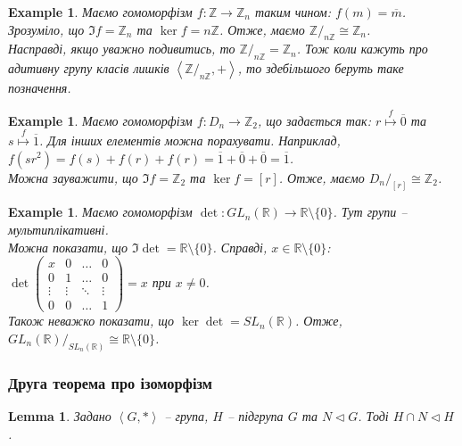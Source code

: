 \documentclass[a4paper, 10pt]{article}
\theoremstyle{theoremdd}
\theoremstyle{theoremdd}
\theoremstyle{theoremdd}
\theoremstyle{theoremdd}
\theoremstyle{theoremdd}
\newtheorem{example}[theorem]{Example}
\theoremstyle{theoremdd}
\theoremstyle{theoremdd}
\theoremstyle{theoremdd}
\theoremstyle{theoremdd}
\theoremstyle{theoremdd}
\theoremstyle{theoremdd}
\theoremstyle{theoremdd}
\theoremstyle{theoremdd}
\newtheorem{lemma}[theorem]{Lemma}
\theoremstyle{theoremdd}
\theoremstyle{theoremdd}
\begin{document}
\begin{example}
Маємо гомоморфізм $f \colon \mathbb{Z} \to \mathbb{Z}_n$ таким чином: $f(m) = \overline{m}$.\\
Зрозуміло, що $\Im f = \mathbb{Z}_n$ та $\ker f = n \mathbb{Z}$. Отже, маємо $\mathbb{Z}/_{n \mathbb{Z}} \cong \mathbb{Z}_n$.\\
Насправді, якщо уважно подивитись, то $\mathbb{Z}/_{n \mathbb{Z}} = \mathbb{Z}_n$. Тож коли кажуть про адитивну групу класів лишків $\left< \mathbb{Z}/_{n \mathbb{Z}}, + \right>$, то здебільшого беруть таке позначення.
\end{example}

\begin{example}
Маємо гомоморфізм $f \colon D_n \to \mathbb{Z}_2$, що задається так: $r \overset{f}{\mapsto} \overline{0}$ та $s \overset{f}{\mapsto} \overline{1}$. Для інших елементів можна порахувати. Наприклад, $f(sr^2) = f(s) + f(r) + f(r)  = \overline{1} + \overline{0} + \overline{0} = \overline{1}$.\\
Можна зауважити, що $\Im f = \mathbb{Z}_2$ та $\ker f = [r]$. Отже, маємо $D_n/_{[r]} \cong \mathbb{Z}_2$.
\end{example}

\begin{example}
Маємо гомоморфізм $\det \colon GL_n(\mathbb{R}) \to \mathbb{R} \setminus \{0\}$. Тут групи -- мультиплікативні.\\
Можна показати, що $\Im \det = \mathbb{R} \setminus \{0\}$. Справді, $x \in \mathbb{R} \setminus \{0\}$:\\
$\det \begin{pmatrix}
x & 0 & \dots & 0 \\
0 & 1 & \dots & 0 \\
\vdots & \vdots & \ddots & \vdots \\
0 & 0 & \dots & 1 
\end{pmatrix} = x$ при $x \neq 0$.\\
Також неважко показати, що $\ker \det = SL_n(\mathbb{R})$. Отже, ${GL_n(\mathbb{R})}/_{SL_n(\mathbb{R})} \cong \mathbb{R} \setminus \{0\}$.
\end{example}

\subsubsection{Друга теорема про ізоморфізм}
\iffalse
\begin{lemma}
Задано $\left< G, * \right>$ -- група, $H$ -- підгрупа $G$ та $N \triangleleft G$. Тоді $H \cap N \triangleleft H$.
\end{lemma}
\end{document}
